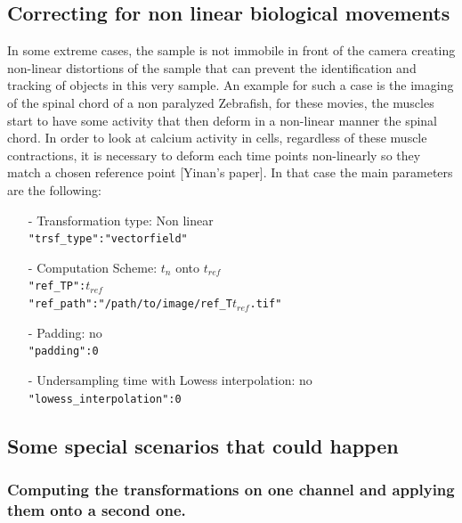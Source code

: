 \documentclass[10pt,a4paper]{article}
\begin{document}
\subsection{Correcting for non linear biological movements}
In some extreme cases, the sample is not immobile in front of the camera creating non-linear distortions of the sample that can prevent the identification and tracking of objects in this very sample. An example for such a case is the imaging of the spinal chord of a non paralyzed Zebrafish, for these movies, the muscles start to have some activity that then deform in a non-linear manner the spinal chord. In order to look at calcium activity in cells, regardless of these muscle contractions, it is necessary to deform each time points non-linearly so they match a chosen reference point [Yinan's paper]. In that case the main parameters are the following:
	\begin{itemize}
		\item[-] Transformation type: Non linear\\
					\texttt{"trsf\_type":"vectorfield"}
		\item[-] Computation Scheme: $t_n$ onto $t_{ref}$\\
					\texttt{"ref\_TP":$t_{ref}$}\\
					\texttt{"ref\_path":"/path/to/image/ref\_T$t_{ref}$.tif"}
		\item[-] Padding: no\\
					\texttt{"padding":0}
		\item[-] Undersampling time with Lowess interpolation: no\\
					\texttt{"lowess\_interpolation":0}
	\end{itemize}
\subsection{Some special scenarios that could happen}
\subsubsection{Computing the transformations on one channel and applying them onto a second one.}
\end{document}
